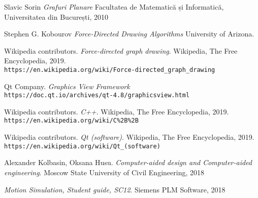 \begin{thebibliography}{9}
    Slavic Sorin
    \textit{Grafuri Planare}
    Facultatea de Matematică și Informatică, Universitatea din București, 2010

    Stephen G. Kobourov
    \textit{Force-Directed Drawing Algorithms}
    University of Arizona.

    Wikipedia contributors. 
    \textit{Force-directed graph drawing}. 
    Wikipedia, The Free Encyclopedia, 2019.
    \\\texttt{https://en.wikipedia.org/wiki/Force-directed\_graph\_drawing}

    Qt Company.
    \textit{Graphics View Framework}
    \\\texttt{https://doc.qt.io/archives/qt-4.8/graphicsview.html}

    Wikipedia contributors. 
    \textit{C++}. 
    Wikipedia, The Free Encyclopedia, 2019.
    \\\texttt{https://en.wikipedia.org/wiki/C\%2B\%2B}

    Wikipedia contributors. 
    \textit{Qt (software)}. 
    Wikipedia, The Free Encyclopedia, 2019.
    \\\texttt{https://en.wikipedia.org/wiki/Qt\_(software)}

    Alexander Kolbasin, Oksana Husu.
    \textit{Computer-aided design and Computer-aided engineering}.
    Moscow State University of Civil Engineering, 2018

    \textit{Motion Simulation, Student guide, SC12}.
    Siemens PLM Software, 2018

    

\end{thebibliography}